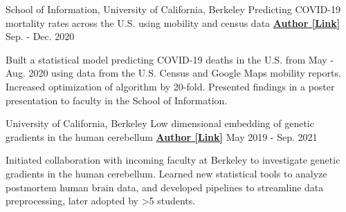 \begin{cventries}
    
    
 \cventry
   {School of Information, University of California, Berkeley} %
   {Predicting COVID-19 mortality rates across the U.S. using mobility and census data} %
    {\href{https://drive.google.com/file/d/1l9TLGLmstkJsvOJQPxHe_f35b4fEkDU4/view}{\textbf{Author [Link]}}}
    {Sep. - Dec. 2020}
    {
      \begin{cvitems} %
      	\item {Built a statistical model predicting COVID-19 deaths in the U.S. from May - Aug. 2020 using data from the U.S. Census and Google Maps mobility reports. Increased optimization of algorithm by 20-fold. Presented findings in a poster presentation to faculty in the School of Information.}
      \end{cvitems}
    }
    
  \cventry
    {University of California, Berkeley} %
    {Low dimensional embedding of genetic gradients in the human cerebellum} %
    {\href{https://papers.ssrn.com/sol3/papers.cfm?abstract_id=3797269}{\textbf{Author [Link]}}}
    {May 2019 - Sep. 2021}
    {
      \begin{cvitems} %
      	\item {Initiated collaboration with incoming faculty at Berkeley to investigate genetic gradients in the human cerebellum. Learned new statistical tools to analyze postmortem human brain data, and developed pipelines to streamline data preprocessing, later adopted by >5 students.}
      \end{cvitems}
    }
    

\end{cventries}
